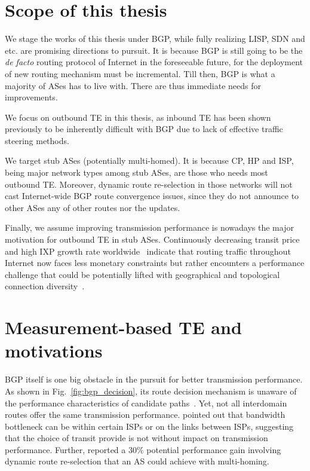\section{Scope of this thesis}
We stage the works of this thesis under BGP, while fully realizing \ac{LISP}, \ac{SDN} and etc. are promising directions to pursuit.
It is because BGP is still going to be the \textit{de facto} routing protocol of Internet in the foreseeable future, for the deployment of new routing mechanism must be incremental.
Till then,  BGP is what a majority of ASes has to live with. 
There are thus immediate needs for improvements.

We focus on outbound TE in this thesis, as inbound TE has been shown previously to be inherently difficult with BGP due to lack of effective traffic steering methods.

We target stub ASes (potentially multi-homed).
It is because \ac{CP}, \ac{HP} and \ac{ISP}, being major network types among stub ASes, are those who needs most outbound TE.
Moreover, dynamic route re-selection in those networks will not cast Internet-wide BGP route convergence issues, since they do not announce to other ASes any of other routes nor the updates.

Finally, we assume improving transmission performance is nowadays the major motivation for outbound TE in stub ASes.
Continuously decreasing transit price~\cite{transitprice, drpeering} and high \ac{IXP} growth rate worldwide~\cite{pchixp} indicate that routing traffic throughout Internet now faces less monetary constraints but rather encounters a performance challenge that could be potentially lifted with geographical and topological connection diversity~\cite{Chiu2015}.


\section{Measurement-based TE and motivations}

BGP itself is one big obstacle in the pursuit for better transmission performance.
As shown in Fig.~\ref{fig:bgp_decision}, its route decision mechanism is unaware of the performance characteristics of candidate paths~\cite{Yannuzzi2005}.
Yet, not all interdomain routes offer the same transmission performance. \citet{Akella2003} pointed out that bandwidth bottleneck can be within certain \acp{ISP} or on the links between \acp{ISP}, suggesting that the choice of transit provide is not without impact on transmission performance.
Further, \citet{Akella2003a} reported a $30\%$ potential performance gain involving dynamic route re-selection that an AS could achieve with multi-homing.

